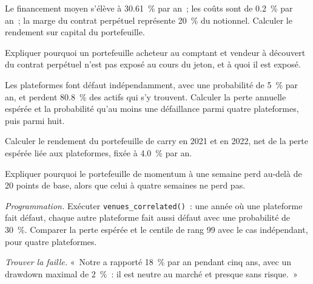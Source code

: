 \begin{exercise}[$\star$]\label{exo:s1:crypto-medium-frequency-strategies:2}
Le financement moyen s'élève à 30.61~\% par an~; les coûts sont de 0.2~\% par an~; la marge du contrat perpétuel représente 20~\% du notionnel. Calculer le rendement sur capital du portefeuille.
\end{exercise}

\begin{exercise}[$\star$]\label{exo:s1:crypto-medium-frequency-strategies:3}
Expliquer pourquoi un portefeuille acheteur au comptant et vendeur à découvert du contrat perpétuel n'est pas exposé au cours du jeton, et à quoi il est exposé.
\end{exercise}

\begin{exercise}[$\star\star$]\label{exo:s1:crypto-medium-frequency-strategies:4}
Les plateformes font défaut indépendamment, avec une probabilité de 5~\% par an, et perdent 80.8~\% des actifs qui s'y trouvent. Calculer la perte annuelle espérée et la probabilité qu'au moins
une défaillance parmi quatre plateformes, puis parmi huit.
\end{exercise}

\begin{exercise}[$\star\star$]\label{exo:s1:crypto-medium-frequency-strategies:5}
Calculer le rendement du portefeuille de carry en 2021 et en 2022, net de la perte espérée liée aux plateformes, fixée à 4.0~\% par an.
\end{exercise}

\begin{exercise}[$\star\star$]\label{exo:s1:crypto-medium-frequency-strategies:6}
Expliquer pourquoi le portefeuille de momentum à une semaine perd au-delà de 20 points de base, alors que celui à quatre semaines ne perd pas.
\end{exercise}

\begin{exercise}[$\star\star\star$]\label{exo:s1:crypto-medium-frequency-strategies:7}
\emph{Programmation.} Exécuter \texttt{venues\_correlated()}~: une année où une plateforme fait défaut, chaque autre plateforme fait aussi défaut avec une probabilité de 30~\%. Comparer la perte espérée
et le centile de rang 99 avec le cas indépendant, pour quatre plateformes.
\end{exercise}

\begin{exercise}[$\star\star\star$]\label{exo:s1:crypto-medium-frequency-strategies:8}
\emph{Trouver la faille.} «~Notre  a rapporté 18~\% par an pendant cinq ans, avec un drawdown maximal de 2~\%~: il est neutre au marché et presque sans risque.~»
\end{exercise}

